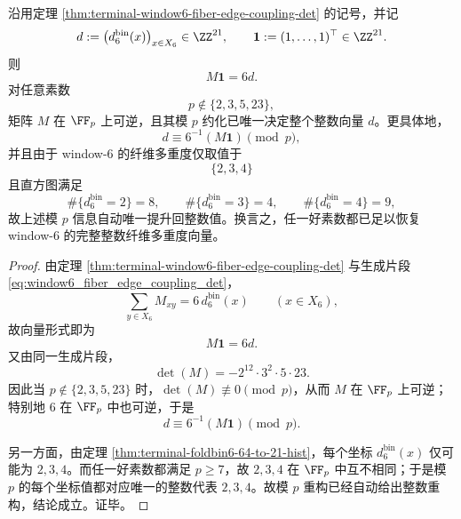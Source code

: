 \begin{theorem}\label{thm:window6-fiber-edge-coupling-single-good-prime-recovers-multiplicity}
沿用定理 \ref{thm:terminal-window6-fiber-edge-coupling-det} 的记号，并记
\[
d:=\bigl(d^{\mathrm{bin}}_6(x)\bigr)_{x\in X_6}\in\ZZ^{21},
\qquad
\mathbf 1:=(1,\dots,1)^\top\in\ZZ^{21}.
\]
则
\[
M\mathbf 1=6d.
\]
对任意素数
\[
p\notin\{2,3,5,23\},
\]
矩阵 \(M\) 在 \(\FF_p\) 上可逆，且其模 \(p\) 约化已唯一决定整个整数向量 \(d\)。更具体地，
\[
\boxed{\;
d\equiv 6^{-1}(M\mathbf 1)\pmod p,
\;}
\]
并且由于 window-\(6\) 的纤维多重度仅取值于
\[
\{2,3,4\}
\]
且直方图满足
\[
\#\{d^{\mathrm{bin}}_6=2\}=8,\qquad
\#\{d^{\mathrm{bin}}_6=3\}=4,\qquad
\#\{d^{\mathrm{bin}}_6=4\}=9,
\]
故上述模 \(p\) 信息自动唯一提升回整数值。换言之，任一好素数都已足以恢复 window-\(6\) 的完整整数纤维多重度向量。
\end{theorem}
\begin{proof}
由定理 \ref{thm:terminal-window6-fiber-edge-coupling-det} 与生成片段 \eqref{eq:window6_fiber_edge_coupling_det}，
\[
\sum_{y\in X_6}M_{xy}=6\,d^{\mathrm{bin}}_6(x)
\qquad(x\in X_6),
\]
故向量形式即为
\[
M\mathbf 1=6d.
\]
又由同一生成片段，
\[
\det(M)=-2^{12}\cdot 3^2\cdot 5\cdot 23.
\]
因此当 \(p\notin\{2,3,5,23\}\) 时，\(\det(M)\not\equiv 0\pmod p\)，从而 \(M\) 在 \(\FF_p\) 上可逆；特别地 \(6\) 在 \(\FF_p\) 中也可逆，于是
\[
d\equiv 6^{-1}(M\mathbf 1)\pmod p.
\]

另一方面，由定理 \ref{thm:terminal-foldbin6-64-to-21-hist}，每个坐标 \(d^{\mathrm{bin}}_6(x)\) 仅可能为 \(2,3,4\)。而任一好素数都满足 \(p\ge 7\)，故 \(2,3,4\) 在 \(\FF_p\) 中互不相同；于是模 \(p\) 的每个坐标值都对应唯一的整数代表 \(2,3,4\)。故模 \(p\) 重构已经自动给出整数重构，结论成立。证毕。
\end{proof}
